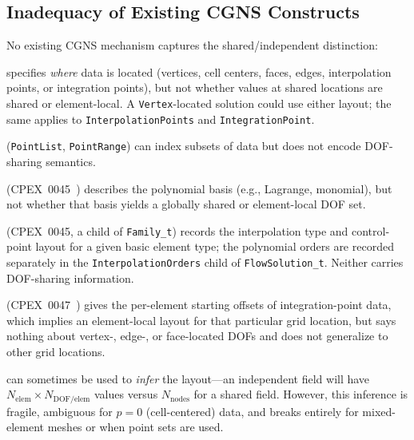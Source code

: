 \documentclass[11pt,letterpaper]{article}
\begin{document}
\subsection{Inadequacy of Existing CGNS Constructs}

No existing CGNS mechanism captures the shared/independent
distinction:

\begin{description}[leftmargin=2em]
\item[\texttt{GridLocation\_t}] specifies \emph{where} data is
  located (vertices, cell centers, faces, edges, interpolation
  points, or integration points), but not whether values at shared
  locations are shared or element-local.  A \texttt{Vertex}-located
  solution could use either layout; the same applies to
  \texttt{InterpolationPoints} and \texttt{IntegrationPoint}.

\item[\texttt{PointSet}] (\texttt{PointList}, \texttt{PointRange})
  can index subsets of data but does not encode DOF-sharing semantics.

\item[\texttt{InterpolationType\_t}] (CPEX~0045~\cite{cpex0045})
  describes the polynomial basis (e.g., Lagrange, monomial), but not
  whether that basis yields a globally shared or element-local DOF set.

\item[\texttt{SolutionInterpolation\_t}] (CPEX~0045, a child of
  \texttt{Family\_t}) records the interpolation type and control-point
  layout for a given basic element type; the polynomial orders are
  recorded separately in the \texttt{InterpolationOrders} child of
  \texttt{FlowSolution\_t}.  Neither carries DOF-sharing information.

\item[\texttt{ItgPointsStartOffset}] (CPEX~0047~\cite{cpex0047})
  gives the per-element starting offsets of integration-point data, which
  implies an element-local layout for that particular grid location, but
  says nothing about vertex-, edge-, or face-located DOFs and does not
  generalize to other grid locations.

\item[Data array size] can sometimes be used to \emph{infer} the
  layout---an independent field will have $N_{\mathrm{elem}} \times
  N_{\mathrm{DOF/elem}}$ values versus $N_{\mathrm{nodes}}$ for a shared
  field.  However, this inference is fragile, ambiguous for $p=0$
  (cell-centered) data, and breaks entirely for mixed-element meshes
  or when point sets are used.
\end{description}
\end{document}

